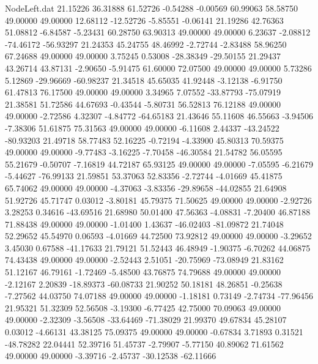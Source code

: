 \begin{filecontents}{NodeLeft.dat}
  21.15226   36.31888   61.52726    -0.54288   -0.00569   60.99063   58.58750   49.00000   49.00000   12.68112  -12.52726   -5.85551   -0.06141
  21.19286   42.76363   51.08812    -6.84587   -5.23431   60.28750   63.90313   49.00000   49.00000    6.23637   -2.08812  -74.46172  -56.93297
  21.24353   45.24755   48.46992    -2.72744   -2.83488   58.96250   67.24688   49.00000   49.00000    3.75245    0.53008  -28.38349  -29.50155
  21.29437   43.26714   43.87131    -2.90650   -5.91475   61.60000   72.07500   49.00000   49.00000    5.73286    5.12869  -29.96669  -60.98237
  21.34518   45.65035   41.92448    -3.12138   -6.91750   61.47813   76.17500   49.00000   49.00000    3.34965    7.07552  -33.87793  -75.07919
  21.38581   51.72586   44.67693    -0.43544   -5.80731   56.52813   76.12188   49.00000   49.00000   -2.72586    4.32307   -4.84772  -64.65183
  21.43646   55.11608   46.55663    -3.94506   -7.38306   51.61875   75.31563   49.00000   49.00000   -6.11608    2.44337  -43.24522  -80.93203
  21.49718   58.77483   52.16225    -0.72194   -4.33900   45.80313   70.59375   49.00000   49.00000   -9.77483   -3.16225   -7.70458  -46.30584
  21.54782   56.05595   55.21679    -0.50707   -7.16819   44.72187   65.93125   49.00000   49.00000   -7.05595   -6.21679   -5.44627  -76.99133
  21.59851   53.37063   52.83356    -2.72744   -4.01669   45.41875   65.74062   49.00000   49.00000   -4.37063   -3.83356  -29.89658  -44.02855
  21.64908   51.92726   45.71747     0.03012   -3.80181   45.79375   71.50625   49.00000   49.00000   -2.92726    3.28253    0.34616  -43.69516
  21.68980   50.01400   47.56363    -4.08831   -7.20400   46.87188   71.88438   49.00000   49.00000   -1.01400    1.43637  -46.02403  -81.09872
  21.74048   52.29652   45.54970     0.06593   -4.01669   44.72500   73.92812   49.00000   49.00000   -3.29652    3.45030    0.67588  -41.17633
  21.79121   51.52443   46.48949    -1.90375   -6.70262   44.06875   74.43438   49.00000   49.00000   -2.52443    2.51051  -20.75969  -73.08949
  21.83162   51.12167   46.79161    -1.72469   -5.48500   43.76875   74.79688   49.00000   49.00000   -2.12167    2.20839  -18.89373  -60.08733
  21.90252   50.18181   48.26851    -0.25638   -7.27562   44.03750   74.07188   49.00000   49.00000   -1.18181    0.73149   -2.74734  -77.96456
  21.95321   51.32309   52.56508    -3.19300   -6.77425   42.75000   70.09063   49.00000   49.00000   -2.32309   -3.56508  -33.64469  -71.38029
  21.99370   49.67834   45.28107     0.03012   -4.66131   43.38125   75.09375   49.00000   49.00000   -0.67834    3.71893    0.31521  -48.78282
  22.04441   52.39716   51.45737    -2.79907   -5.77150   40.89062   71.61562   49.00000   49.00000   -3.39716   -2.45737  -30.12538  -62.11666

\end{filecontents}
